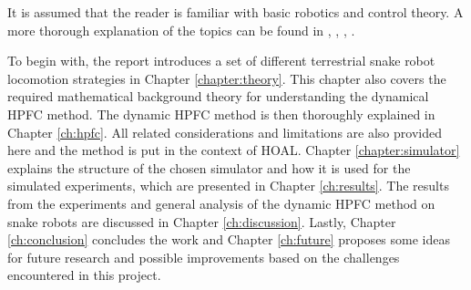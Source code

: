 It is assumed that the reader is familiar with basic robotics and control theory. A more thorough explanation of the topics can be found in \cite{lynch2017modern}, \cite{lynch2017modernCompTorque}, \cite{waldron2016kinematics}, \cite{liljeback2012snake}.

To begin with, the report introduces a set of different terrestrial snake robot locomotion strategies in Chapter \ref{chapter:theory}. This chapter also covers the required mathematical background theory for understanding the dynamical HPFC method. The dynamic HPFC method is then thoroughly explained in Chapter \ref{ch:hpfc}. All related considerations and limitations are also provided here and the method is put in the context of HOAL. Chapter \ref{chapter:simulator} explains the structure of the chosen simulator and how it is used for the simulated experiments, which are presented in Chapter \ref{ch:results}. The results from the experiments and general analysis of the dynamic HPFC method on snake robots are discussed in Chapter \ref{ch:discussion}. Lastly, Chapter \ref{ch:conclusion} concludes the work and Chapter \ref{ch:future} proposes some ideas for future research and possible improvements based on the challenges encountered in this project.